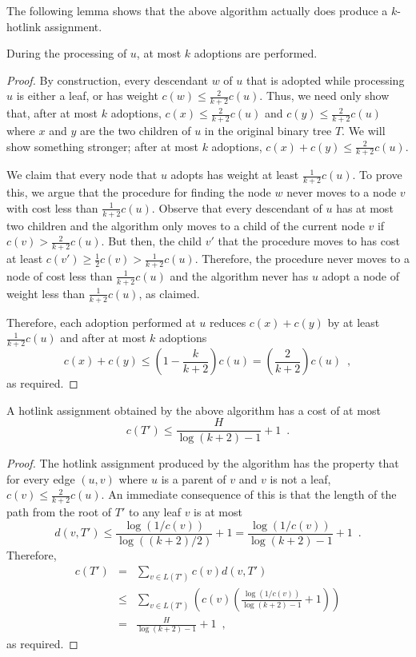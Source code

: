 \documentclass[lotsofwhite]{patmorin}
\newcommand{\path}{d}
\newcommand{\cost}{c}
\begin{document}
The following lemma shows that the above algorithm actually does
produce a $k$-hotlink assignment.
\begin{lem}
During the processing of $u$, at most $k$ adoptions are performed.
\end{lem}

\begin{proof}
By construction, every descendant $w$ of $u$ that is adopted while
processing $u$ is either a leaf, or has weight
$\cost(w)\le\frac{2}{k+2}\cost(u)$.  Thus, we need only show that,
after at most $k$ adoptions, $\cost(x)\le\frac{2}{k+2}\cost(u)$ and
$\cost(y)\le\frac{2}{k+2}\cost(u)$ where $x$ and $y$ are the two
children of $u$ in the original binary tree $T$.  We will show
something stronger; after at most $k$ adoptions,
$\cost(x)+\cost(y)\le\frac{2}{k+2}\cost(u)$.

We claim that every node that $u$ adopts has weight at least
$\frac{1}{k+2}\cost(u)$.  To prove this, we argue that the procedure
for finding the node $w$ never moves to a node $v$ with cost less than
$\frac{1}{k+2}\cost(u)$.  Observe that every descendant of $u$ has at
most two children and the algorithm only moves to a child of the
current node $v$ if $\cost(v)>\frac{2}{k+2}\cost(u)$.  But then, the
child $v'$ that the procedure moves to has cost at least
$\cost(v')\ge\frac{1}{2}\cost(v)>\frac{1}{k+2}\cost(u)$.  Therefore,
the procedure never moves to a node of cost less than
$\frac{1}{k+2}\cost(u)$ and the algorithm never has $u$ adopt a node
of weight less than $\frac{1}{k+2}\cost(u)$, as claimed.

Therefore, each adoption performed at $u$ reduces $\cost(x)+\cost(y)$
by at least $\frac{1}{k+2}\cost(u)$ and after at most $k$ adoptions
\[ \cost(x)+\cost(y)\le \left(1-\frac{k}{k+2}\right)\cost(u)
        = \left(\frac{2}{k+2}\right)\cost(u) \enspace ,
\]
as required.
\end{proof}

\begin{thm}
A hotlink assignment obtained by the above algorithm has a cost of at most
\[
  \cost(T')\le \frac{H}{\log(k+2)-1} + 1 \enspace .
\]
\end{thm}

\begin{proof}
The hotlink assignment produced by the algorithm has the property that
for every edge $(u,v)$ where $u$ is a parent of $v$ and $v$ is not a
leaf, $\cost(v)\le\frac{2}{k+2}\cost(u)$.  An immediate consequence of
this is that the length of the path from the root of $T'$ to any leaf
$v$ is at most
\[
  \path(v,T')\le \frac{\log(1/\cost(v))}{\log((k+2)/2)} + 1 =
  \frac{\log(1/\cost(v))}{\log(k+2)-1} + 1 \enspace .
\]
Therefore,
\begin{eqnarray*}
\cost(T') & = & \sum_{v\in L(T')}\cost(v)\path(v,T') \\ 
        & \le & \sum_{v\in
L(T')}\left(\cost(v)\left(\frac{\log(1/\cost(v))}{\log(k+2)-1}+1\right)\right) \\ 
        & = & \frac{H}{\log(k+2)-1} + 1 \enspace , 
\end{eqnarray*}
as required.
\end{proof}
\end{document}
